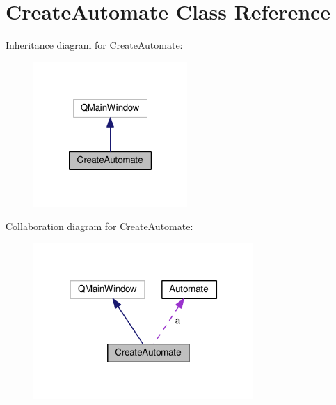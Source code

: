 \hypertarget{class_create_automate}{\section{Create\-Automate Class Reference}
\label{class_create_automate}
}


Inheritance diagram for Create\-Automate\-:
\nopagebreak
\begin{figure}[H]
\begin{center}
\leavevmode
\includegraphics[width=166pt]{class_create_automate__inherit__graph}
\end{center}
\end{figure}


Collaboration diagram for Create\-Automate\-:
\nopagebreak
\begin{figure}[H]
\begin{center}
\leavevmode
\includegraphics[width=237pt]{class_create_automate__coll__graph}
\end{center}
\end{figure}
